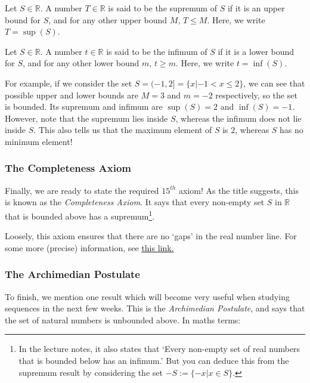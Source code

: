 \documentclass[
  10pt,
  a4paper]{article}
\theoremstyle{plain}
\theoremstyle{definition}
\theoremstyle{plain}
\theoremstyle{plain}
\theoremstyle{plain}
\theoremstyle{plain}
\theoremstyle{definition}
\theoremstyle{definition}
\newtheorem*{Order Axioms*}{Order Axioms}\newtheorem{Order Axioms}{Order Axioms}[section]
\theoremstyle{remark}
\theoremstyle{remark}
\let\BeginKnitrBlock\begin \let\EndKnitrBlock\end
\begin{document}
\BeginKnitrBlock{definition}[Supremum]
{\label{def:def4} }Let \(S \in \mathbb{R}\). A number \(T \in \mathbb{R}\) is said to be the supremum of \(S\) if it is an upper bound for \(S\), and for any other upper bound \(M\), \(T \leq M\). Here, we write \(T = \sup(S)\).
\EndKnitrBlock{definition}

\BeginKnitrBlock{definition}[Infimum]
{\label{def:def5} }Let \(S \in \mathbb{R}\). A number \(t \in \mathbb{R}\) is said to be the infimum of \(S\) if it is a lower bound for \(S\), and for any other lower bound \(m\), \(t\geq m\). Here, we write \(t = \inf(S)\).
\EndKnitrBlock{definition}

For example, if we consider the set \(S = (-1,2] = \lbrace x \lvert -1<x\leq2\rbrace\), we can see that possible upper and lower bounds are \(M = 3\) and \(m = -2\) respectively, so the set is bounded. Its supremum and infimum are \(\sup(S) = 2\) and \(\inf(S) = -1\). However, note that the supremum lies inside \(S\), whereas the infimum does not lie inside \(S\). This also tells us that the maximum element of \(S\) is \(2\), whereas \(S\) has no minimum element!

\hypertarget{the-completeness-axiom}{%
\subsubsection{The Completeness Axiom}\label{the-completeness-axiom}}

Finally, we are ready to state the required \(15^{th}\) axiom! As the title suggests, this is known as the \emph{Completeness Axiom}. It says that every non-empty set \(S\) in \(\mathbb{R}\) that is bounded above has a supremum\footnote{In the lecture notes, it also states that `Every non-empty set of real numbers that is bounded below has an infimum.' But you can deduce this from the supremum result by considering the set \(-S:=\lbrace -x \lvert x \in S\rbrace.\)}.

Loosely, this axiom ensures that there are no `gaps' in the real number line. For some more (precise) information, see \href{https://en.wikipedia.org/wiki/Completeness_of_the_real_numbers}{this link.}

\hypertarget{the-archimedian-postulate}{%
\subsubsection{The Archimedian Postulate}\label{the-archimedian-postulate}}

To finish, we mention one result which will become very useful when studying sequences in the next few weeks. This is the \emph{Archimedian Postulate}, and says that the set of natural numbers is unbounded above. In maths terms:
\end{document}
